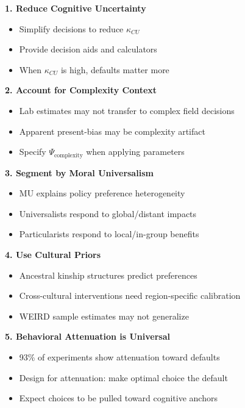 \begin{tcolorbox}[colback=green!5!white, colframe=green!75!black,
    title=Practical Implications from Enke's Research]

\textbf{1. Reduce Cognitive Uncertainty}
\begin{itemize}[nosep]
    \item Simplify decisions to reduce $\kappa_{CU}$
    \item Provide decision aids and calculators
    \item When $\kappa_{CU}$ is high, defaults matter more
\end{itemize}

\textbf{2. Account for Complexity Context}
\begin{itemize}[nosep]
    \item Lab estimates may not transfer to complex field decisions
    \item Apparent present-bias may be complexity artifact
    \item Specify $\Psi_{\text{complexity}}$ when applying parameters
\end{itemize}

\textbf{3. Segment by Moral Universalism}
\begin{itemize}[nosep]
    \item MU explains policy preference heterogeneity
    \item Universalists respond to global/distant impacts
    \item Particularists respond to local/in-group benefits
\end{itemize}

\textbf{4. Use Cultural Priors}
\begin{itemize}[nosep]
    \item Ancestral kinship structures predict preferences
    \item Cross-cultural interventions need region-specific calibration
    \item WEIRD sample estimates may not generalize
\end{itemize}

\textbf{5. Behavioral Attenuation is Universal}
\begin{itemize}[nosep]
    \item 93\% of experiments show attenuation toward defaults
    \item Design for attenuation: make optimal choice the default
    \item Expect choices to be pulled toward cognitive anchors
\end{itemize}

\end{tcolorbox}


